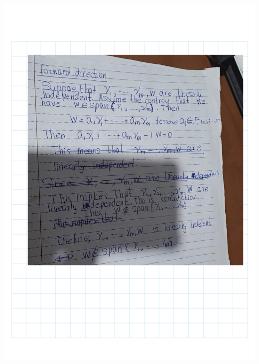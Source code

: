 \documentclass[
]{book}
\theoremstyle{definition}
\theoremstyle{definition}
\theoremstyle{definition}
\theoremstyle{definition}
\theoremstyle{remark}
\begin{document}
\includegraphics{fig/Ex2A/Ex2A-16.png}
\end{document}
